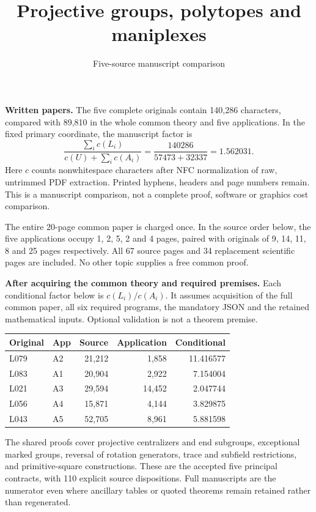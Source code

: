 \documentclass[11pt,a4paper]{article}
\title{Projective groups, polytopes and maniplexes}
\author{Five-source manuscript comparison}\date{}
\begin{document}
\maketitle
\textbf{Written papers.} The five complete originals contain 140,286 characters, compared with 89,810 in the whole common theory and five applications. In the fixed primary coordinate, the manuscript factor is
\[
 \frac{\sum_i c(L_i)}{c(U)+\sum_i c(A_i)}
 =\frac{140286}{57473+32337}
 =1.562031.
\]
Here $c$ counts nonwhitespace characters after NFC normalization of raw, untrimmed PDF extraction. Printed hyphens, headers and page numbers remain. This is a manuscript comparison, not a complete proof, software or graphics cost comparison.

The entire 20-page common paper is charged once. In the source order below, the five applications occupy 1, 2, 5, 2 and 4 pages, paired with originals of 9, 14, 11, 8 and 25 pages respectively. All 67 source pages and 34 replacement scientific pages are included. No other topic supplies a free common proof.

\textbf{After acquiring the common theory and required premises.} Each conditional factor below is $c(L_i)/c(A_i)$. It assumes acquisition of the full common paper, all six required programs, the mandatory JSON and the retained mathematical inputs. Optional validation is not a theorem premise.
\begin{center}\begin{tabular}{llrrr}\toprule
Original & App & Source & Application & Conditional\\\midrule
L079 & A2 & 21,212 & 1,858 & 11.416577\\
L083 & A1 & 20,904 & 2,922 & 7.154004\\
L021 & A3 & 29,594 & 14,452 & 2.047744\\
L056 & A4 & 15,871 & 4,144 & 3.829875\\
L043 & A5 & 52,705 & 8,961 & 5.881598\\
\bottomrule\end{tabular}\end{center}

The shared proofs cover projective centralizers and end subgroups, exceptional marked groups, reversal of rotation generators, trace and subfield restrictions, and primitive-square constructions. These are the accepted five principal contracts, with 110 explicit source dispositions. Full manuscripts are the numerator even where ancillary tables or quoted theorems remain retained rather than regenerated.
\end{document}
